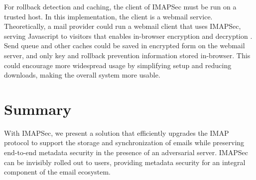 \documentclass[pageno]{jpaper}
\newcommand{\project}{IMAPSec }
\newcommand{\projectnospace}{IMAPSec}
\begin{document}
For rollback detection and caching, the client of \project must be run on a trusted host. In this implementation, the client is a webmail service. Theoretically, a mail provider could run a webmail client that uses \projectnospace, serving Javascript to visitors that enables in-browser encryption and decryption \cite{wagner}. Send queue and other caches could be saved in encrypted form on the webmail server, and only key and rollback prevention information stored in-browser. This could encourage more widespread usage by simplifying setup and reducing downloads, making the overall system more usable.

\section{Summary}
With \projectnospace, we present a solution that efficiently upgrades the IMAP protocol to support the storage and synchronization of emails while preserving end-to-end metadata security in the presence of an adversarial server. \project can be invisibly rolled out to users, providing metadata security for an integral component of the email ecosystem.

\pagebreak



\end{document}

